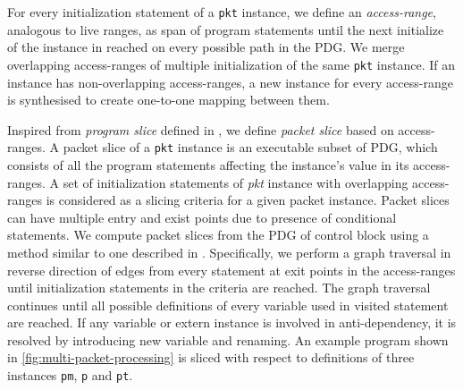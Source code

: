 \documentclass[letterpaper,twocolumn,10pt]{article}
\begin{document}

For every initialization statement of a \texttt{pkt} instance, we 
define an \emph{access-range}, analogous to live ranges, as span of 
program statements until the next initialize of the instance in 
reached on every possible path in the PDG.
We merge overlapping access-ranges of multiple initialization of the 
same \texttt{pkt} instance. If an instance has non-overlapping 
access-ranges, a new instance for every access-range is synthesised to 
create one-to-one mapping between them.


Inspired from \emph{program slice} defined in 
\cite{Weiser:1981:PS:800078.802557}, we define \emph{packet slice} 
based on access-ranges. A packet slice of a \texttt{pkt} instance is 
an executable subset of PDG, which consists of all the program 
statements affecting the instance's value in its access-ranges.
A set of initialization statements of \emph{pkt} instance with 
overlapping access-ranges is considered as a slicing criteria for a 
given packet instance. Packet slices can have multiple entry and 
exist points due to presence of conditional statements.
We compute packet slices from the PDG of control block using a method 
similar to one described in \cite{Ferrante:1987:PDG:24039.24041}.
Specifically, we perform a graph traversal in reverse direction of 
edges from every statement at exit points in the access-ranges until 
initialization statements in the criteria are reached.
The graph traversal continues until all possible definitions of every 
variable used in visited statement are reached.
If any variable or extern instance is involved in anti-dependency, it 
is resolved by introducing new variable and renaming.
An example program shown in \cref{fig:multi-packet-processing} 
is sliced with respect to definitions of three instances 
\texttt{pm}, \texttt{p} and \texttt{pt}.
\end{document}
